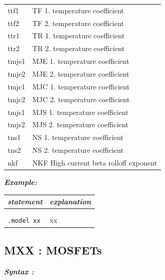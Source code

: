 \begin{longtable}{l l}
{\small ttf1} & {\small TF 1. temperature coefficient} \\ 
{\small ttf2} & {\small TF 2. temperature coefficient} \\ 
{\small ttr1} & {\small TR 1. temperature coefficient} \\ 
{\small ttr2} & {\small TR 2. temperature coefficient} \\ 
{\small tmje1} & {\small MJE 1. temperature coefficient} \\
{\small tmje2} & {\small MJE 2. temperature coefficient} \\
{\small tmjc1} & {\small MJC 1. temperature coefficient} \\
{\small tmjc2} & {\small MJC 2. temperature coefficient} \\
{\small tmjs1} & {\small MJS 1. temperature coefficient} \\
{\small tmjs2} & {\small MJS 2. temperature coefficient} \\
{\small tns1} & {\small NS 1. temperature coefficient} \\
{\small tns2} & {\small NS 2. temperature coefficient} \\
{\small nkf} & {\small NKF High current beta rolloff exponent} 
\end{longtable}																				


\textbf{\textit{Example:}}

\begin{longtable}{l l}
\textit{statement} & \textit{explanation} \\ \hline \\ %
			\begin{minipage}{15em}{\texttt{xx}\\ 
			\texttt{.model xx}}\end{minipage}
			& \begin{minipage}{15em}{{\small xx}}\end{minipage} 
\end{longtable}

\newpage
\subsection{MXX : MOSFETs}
\label{subsec_sceadm_mosfets}

\textbf{\textit{Syntax :}}


